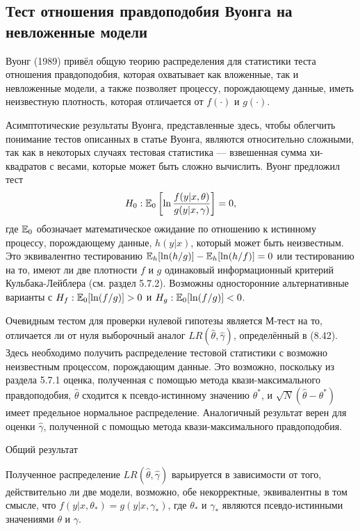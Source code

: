 \subsection{Тест отношения правдоподобия Вуонга на невложенные модели}

Вуонг (1989) привёл общую теорию распределения для статистики теста отношения правдоподобия, которая охватывает как вложенные, так и невложенные модели, а также позволяет процессу, порождающему данные, иметь неизвестную плотность, которая отличается от $f(\cdot)$ и $g(\cdot)$.

Асимптотические результаты Вуонга, представленные здесь, чтобы облегчить понимание тестов описанных в статье Вуонга, являются относительно сложными, так как в некоторых случаях тестовая статистика --- взвешенная сумма хи-квадратов с весами, которые может быть сложно вычислить. Вуонг предложил тест
\begin{equation}
H_0: \mathbb{E}_0 \left[ \ln \frac{f(y|x, \theta)}{g(y|x, \gamma)} \right] = 0,
\end{equation}
где $\mathbb{E}_0$ обозначает математическое ожидание по отношению к истинному процессу, порождающему данные, $h(y|x)$, который может быть неизвестным. Это эквивалентно тестированию $\mathbb{E}_h[\ln (h/g)] - \mathbb{E}_h[\ln (h/f)] = 0$ или тестированию на то, имеют ли две плотности $f$ и $g$ одинаковый информационный критерий Кульбака-Лейблера (см. раздел 5.7.2). Возможны односторонние альтернативные варианты с $H_f: \mathbb{E}_0[\ln (f/g)] > 0$ и $H_g: \mathbb{E}_0[\ln (f/g)] < 0$.

Очевидным тестом для проверки нулевой гипотезы является М-тест на то, отличается ли от нуля выборочный аналог $LR(\hat{\theta}, \hat{\gamma})$, определённый в (8.42). Здесь необходимо получить распределение тестовой статистики с возможно неизвестным процессом, порождающим данные. Это возможно, поскольку из раздела 5.7.1 оценка, полученная с помощью метода квази-максимального правдоподобия, $\hat{\theta}$ сходится к псевдо-истинному значению $\theta^*$, и $\sqrt{N}(\hat{\theta} - \theta^*)$ имеет предельное нормальное распределение. Аналогичный результат верен для оценки $\hat{\gamma}$, полученной с помощью метода квази-максимального правдоподобия.

\begin{center}
Общий результат
\end{center}

Полученное распределение $LR(\hat{\theta}, \hat{\gamma})$ варьируется в зависимости от того, действительно ли две модели, возможно, обе некорректные, эквивалентны в том смысле, что $f(y|x, \theta_*) = g(y|x, \gamma_*)$, где $\theta_*$ и $\gamma_*$ являются псевдо-истинными значениями $\theta$ и $\gamma$.

